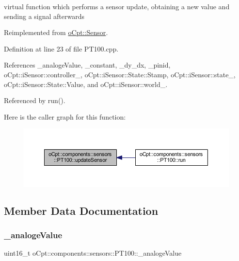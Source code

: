 virtual function which performs a sensor update, obtaining a new value and sending a signal afterwards 

Reimplemented from \hyperlink{classo_cpt_1_1_sensor_ab4b0dedb06f11bcf2368852035beb2b2}{o\+Cpt\+::\+Sensor}.



Definition at line 23 of file P\+T100.\+cpp.



References \+\_\+analoge\+Value, \+\_\+constant, \+\_\+dy\+\_\+dx, \+\_\+pinid, o\+Cpt\+::i\+Sensor\+::controller\+\_\+, o\+Cpt\+::i\+Sensor\+::\+State\+::\+Stamp, o\+Cpt\+::i\+Sensor\+::state\+\_\+, o\+Cpt\+::i\+Sensor\+::\+State\+::\+Value, and o\+Cpt\+::i\+Sensor\+::world\+\_\+.



Referenced by run().

Here is the caller graph for this function\+:\nopagebreak
\begin{figure}[H]
\begin{center}
\leavevmode
\includegraphics[width=350pt]{classo_cpt_1_1components_1_1sensors_1_1_p_t100_a66619675288a5344a55242d9bf097aee_icgraph}
\end{center}
\end{figure}


\subsection{Member Data Documentation}
\hypertarget{classo_cpt_1_1components_1_1sensors_1_1_p_t100_aeb98d92a8864ca202bcc7f382a6053c0}{}\label{classo_cpt_1_1components_1_1sensors_1_1_p_t100_aeb98d92a8864ca202bcc7f382a6053c0} 
\subsubsection{\texorpdfstring{\+\_\+analoge\+Value}{\_analogeValue}}
{\footnotesize\ttfamily uint16\+\_\+t o\+Cpt\+::components\+::sensors\+::\+P\+T100\+::\+\_\+analoge\+Value\hspace{0.3cm}{\ttfamily [private]}}



